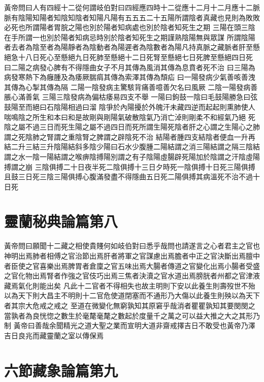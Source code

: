 黃帝問曰人有四經十二從何謂岐伯對曰四經應四時十二從應十二月十二月應十二脈脈有陰陽知陽者知陰知陰者知陽凡陽有五五五二十五陽所謂陰者真藏也見則為敗敗必死也所謂陽者胃脘之陽也別於陽者知病處也別於陰者知死生之期
三陽在頭三陰在手所謂一也別於陽者知病忌時別於陰者知死生之期謹熟陰陽無與眾謀
所謂陰陽者去者為陰至者為陽靜者為陰動者為陽遲者為陰數者為陽凡持真脈之藏脈者肝至懸絕急十八日死心至懸絕九日死肺至懸絕十二日死腎至懸絕七日死脾至懸絕四日死
曰二陽之病發心脾有不得隱曲女子不月其傳為風消其傳為息賁者死不治
曰三陽為病發寒熱下為癰腫及為痿厥腨㾓其傳為索澤其傳為頹疝
曰一陽發病少氣善咳善洩其傳為心掣其傳為隔
二陽一陰發病主驚駭背痛善噫善欠名曰風厥
二陰一陽發病善脹心滿善氣
三陽三陰發病為偏枯痿易四支不舉
一陽曰鉤鼓一陰曰毛鼓陽勝急曰弦鼓陽至而絕曰石陰陽相過曰溜
陰爭於內陽擾於外魄汗未藏四逆而起起則熏肺使人喘鳴陰之所生和本曰和是故剛與剛陽氣破散陰氣乃消亡淖則剛柔不和經氣乃絕
死陰之屬不過三日而死生陽之屬不過四日而死所謂生陽死陰者肝之心謂之生陽心之肺謂之死陰肺之腎謂之重陰腎之脾謂之辟陰死不治
結陽者腫四支結陰者便血一升再結二升三結三升陰陽結斜多陰少陽曰石水少腹腫二陽結謂之消三陽結謂之隔三陰結謂之水一陰一陽結謂之喉痹陰搏陽別謂之有子陰陽虛腸辟死陽加於陰謂之汗陰虛陽搏謂之崩
三陰俱搏二十日夜半死二陰俱搏十三日夕時死一陰俱搏十日死三陽俱搏且鼓三日死三陰三陽俱搏心腹滿發盡不得隱曲五日死二陽俱搏其病溫死不治不過十日死


\section{靈蘭秘典論篇第八}
黃帝問曰願聞十二藏之相使貴賤何如岐伯對曰悉乎哉問也請遂言之心者君主之官也神明出焉肺者相傅之官治節出焉肝者將軍之官謀慮出焉膽者中正之官決斷出焉膻中者臣使之官喜樂出焉脾胃者倉廩之官五味出焉大腸者傳道之官變化出焉小腸者受盛之官化物出焉腎者作強之官伎巧出焉三焦者決瀆之官水道出焉膀胱者州都之官津液藏焉氣化則能出矣
凡此十二官者不得相失也故主明則下安以此養生則壽歿世不殆以為天下則大昌主不明則十二官危使道閉塞而不通形乃大傷以此養生則殃以為天下者其宗大危戒之戒之
至道在微變化無窮孰知其原窘乎哉消者瞿瞿孰知其要閔閔之當孰者為良恍惚之數生於毫氂毫氂之數起於度量千之萬之可以益大推之大之其形乃制
黃帝曰善哉余聞精光之道大聖之業而宣明大道非齋戒擇吉日不敢受也黃帝乃澤吉日良兆而藏靈蘭之室以傳保焉

\section{六節藏象論篇第九}

